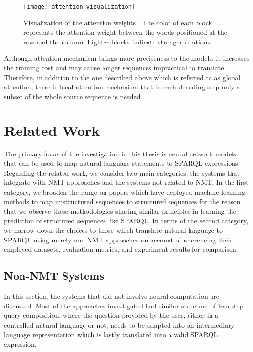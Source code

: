 \begin{figure}[h]
\texttt{[image: attention-visualization]}
\centering
\caption{Visualization of the attention weights \cite{Luong2015}. The color of each block represents the attention weight between the words positioned at the row and the column. Lighter blocks indicate stronger relations.}
\label{figure:attention visualization}
\end{figure}

Although attention mechanism brings more preciseness to the models, it increases the training cost and may cause longer sequences impractical to translate. Therefore, in addition to the one described above which is referred to as global attention, there is local attention mechanism that in each decoding step only a subset of the whole source sequence is needed \cite{Luong2015}.

\section{Related Work} \label{section:related work}

The primary focus of the investigation in this thesis is neural network models that can be used to map natural language statements to SPARQL expressions. Regarding the related work, we consider two main categories: the systems that integrate with NMT approaches and the systems not related to NMT. In the first category, we broaden the range on papers which have deployed machine learning methods to map unstructured sequences to structured sequences for the reason that we observe these methodologies sharing similar principles in learning the prediction of structured sequences like SPARQL. In terms of the second category, we narrow down the choices to those which translate natural language to SPARQL using merely non-NMT approaches on account of referencing their employed datasets, evaluation metrics, and experiment results for comparison. 

\subsection{Non-NMT Systems} \label{subsection: non-nmt related work}

In this section, the systems that did not involve neural computation are discussed. Most of the approaches investigated had similar structure of two-step query composition, where the question provided by the user, either in a controlled natural language or not, needs to be adapted into an intermediary language representation which is lastly translated into a valid SPARQL expression.

